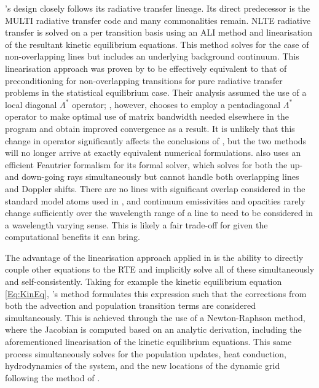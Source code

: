 \Radyn{}'s design closely follows its radiative transfer lineage. Its direct predecessor is the MULTI radiative transfer code \citep{Carlsson1986,Carlsson1992} and many commonalities remain.
NLTE radiative transfer is solved on a per transition basis using an ALI method and linearisation of the resultant kinetic equilibrium equations.
This method solves for the case of non-overlapping lines but includes an underlying background continuum.
This linearisation approach was proven by \citet{SocasNavarro1997} to be effectively equivalent to that of preconditioning for non-overlapping transitions \citep[i.e. MALI,][]{Rybicki1991} for pure radiative transfer problems in the statistical equilibrium case.
Their analysis assumed the use of a local diagonal $\Lambda^*$ operator; \Radyn{}, however, chooses to employ a pentadiagonal $\Lambda^*$ operator to make optimal use of matrix bandwidth needed elsewhere in the program and obtain improved convergence as a result.
It is unlikely that this change in operator significantly affects the conclusions of \citet{SocasNavarro1997}, but the two methods will no longer arrive at exactly equivalent numerical formulations.
\Radyn{} also uses an efficient Feautrier formalism for its formal solver, which solves for both the up- and down-going rays simultaneously but cannot handle both overlapping lines and Doppler shifts.
There are no lines with significant overlap considered in the standard model atoms used in \Radyn{}, and continuum emissivities and opacities rarely change sufficiently over the wavelength range of a line to need to be considered in a wavelength varying sense.
This is likely a fair trade-off for \Radyn{} given the computational benefits it can bring.

The advantage of the linearisation approach applied in \Radyn{} is the ability to directly couple other equations to the RTE and implicitly solve all of these simultaneously and self-consistently.
Taking for example the kinetic equilibrium equation \eqref{Eq:KinEq}, \Radyn{}'s method formulates this expression such that the corrections from both the advection and population transition terms are considered simultaneously.
This is achieved through the use of a Newton-Raphson method, where the Jacobian is computed based on an analytic derivation, including the aforementioned linearisation of the kinetic equilibrium equations.
This same process simultaneously solves for the population updates, heat conduction, hydrodynamics of the system, and the new locations of the dynamic grid  following the method of \citet{Dorfi1987}.

